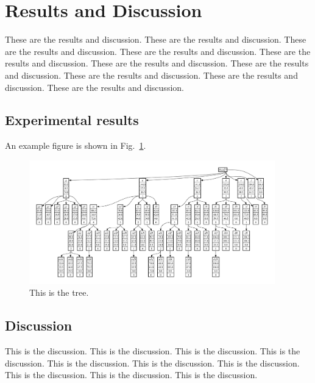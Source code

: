 \section{Results and Discussion} 
\label{sec:5}

These are the results and discussion. These are the results and discussion. These are the results and discussion. These are the results and discussion. These are the results and discussion. These are the results and discussion. These are the results and discussion. These are the results and discussion. These are the results and discussion. These are the results and discussion. 

\subsection{Experimental results}

An example figure is shown in Fig.~\ref{fig:tree}. 

\begin{figure}
	\centerline{\includegraphics[width=0.95\textwidth]{../Figure/tree.pdf}}
	\caption{This is the tree. }
	\label{fig:tree}
\end{figure}

\subsection{Discussion}

This is the discussion. This is the discussion. This is the discussion. This is the discussion. This is the discussion. This is the discussion. This is the discussion. This is the discussion. This is the discussion. This is the discussion. 